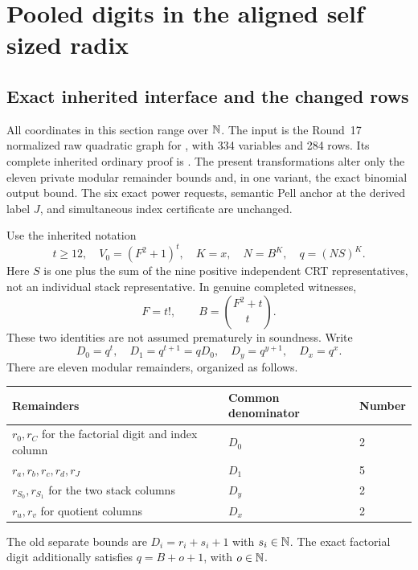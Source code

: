 \section{Pooled digits in the aligned self sized radix}
\label{sec:natural}
\subsection{Exact inherited interface and the changed rows}
All coordinates in this section range over $\mathbb N$. The input is the
Round~17 normalized raw quadratic graph for , with
334 variables and 284 rows. Its complete inherited ordinary proof is
. The present transformations alter
only the eleven private modular remainder bounds and, in one variant,
the exact binomial output bound. The six exact power requests, semantic
Pell anchor at the derived label $J$, and simultaneous index certificate
are unchanged.

Use the inherited notation
\[
 t\ge12,\quad V_0=(F^2+1)^t,\quad K=x,\quad N=B^K,
 \quad q=(NS)^K.
\]
Here $S$ is one plus the sum of the nine positive independent CRT
representatives, not an individual stack representative. In genuine
completed witnesses,
\[
 F=t!,\qquad B=\binom{F^2+t}{t}.
\]
These two identities are not assumed prematurely in soundness. Write
\[
 D_0=q^t,\quad D_1=q^{t+1}=qD_0,\quad
 D_y=q^{y+1},\quad D_x=q^x.
\]
There are eleven modular remainders, organized as follows.
\begin{center}\small
\begin{tabular}{@{}lll@{}}\toprule
Remainders & Common denominator & Number\\\midrule
$r_0,r_C$ for the factorial digit and index column & $D_0$ & 2\\
$r_a,r_b,r_c,r_d,r_J$ & $D_1$ & 5\\
$r_{S_0},r_{S_1}$ for the two stack columns & $D_y$ & 2\\
$r_u,r_v$ for quotient columns & $D_x$ & 2\\\bottomrule
\end{tabular}
\end{center}
The old separate bounds are $D_i=r_i+s_i+1$ with $s_i\in\mathbb N$.
The exact factorial digit additionally satisfies $q=B+o+1$, with
$o\in\mathbb N$.

